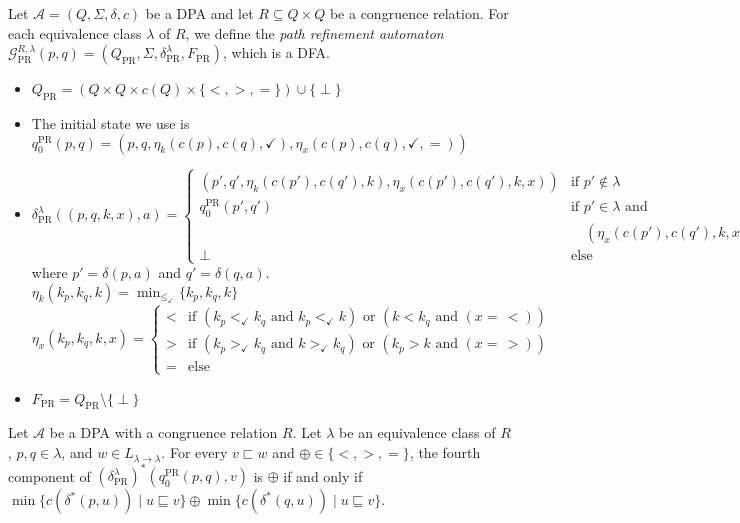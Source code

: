 \begin{defn}
	Let $\mathcal{A} = (Q, \Sigma, \delta, c)$ be a DPA and let $R \subseteq Q \times Q$ be a congruence relation. For each equivalence class $\lambda$ of $R$, we define the \emph{path refinement automaton} $\mathcal{G}_\text{PR}^{R,\lambda}(p, q) = (Q_\text{PR}, \Sigma, \delta^\lambda_\text{PR}, F_\text{PR})$, which is a DFA.
	
	\begin{itemize}
		\item $Q_\text{PR} = (Q \times Q \times c(Q) \times \{<, >, =\}) \cup \{ \perp \}$
		\item The initial state we use is $q_0^\text{PR}(p, q) = (p, q, \eta_k(c(p), c(q), \checkmark), \eta_x(c(p), c(q), \checkmark, =))$
		\item $\delta^\lambda_\text{PR}((p, q, k, x), a) = \begin{cases}
			(p', q', \eta_k(c(p'), c(q'), k), \eta_x(c(p'), c(q'), k, x)) & \text{if } p' \notin \lambda \\
			q_0^\text{PR}(p', q') & \text{if } p' \in \lambda \text{ and } \\ 
			& \quad (\eta_x(c(p'), c(q'), k, x) =\, =) \\
			\perp & \text{else}
		\end{cases}$ \\
			where $p' = \delta(p, a)$ and $q' = \delta(q, a)$. \\
			$\eta_k(k_p, k_q, k) = \min_{\leq_\checkmark} \{k_p, k_q, k\}$ \\
			$\eta_x(k_p, k_q, k, x) = \begin{cases}
				< & \text{if } (k_p <_\checkmark k_q \text{ and } k_p <_\checkmark k) \text{ or } (k < k_q \text{ and } (x =\, <)) \\
				> & \text{if } (k_p >_\checkmark k_q \text{ and } k >_\checkmark k_q) \text{ or } (k_p > k \text{ and } (x =\, >)) \\
				= & \text{else}
			\end{cases}$ 
		\item $F_\text{PR} = Q_\text{PR} \setminus \{\perp\}$
	\end{itemize}
\end{defn}

\begin{lem}
	Let $\mathcal{A}$ be a DPA with a congruence relation $R$. Let $\lambda$ be an equivalence class of $R$, $p, q \in \lambda$, and $w \in L_{\lambda \rightarrow \lambda}$. For every $v \sqsubset w$ and $\oplus \in \{<, >, =\}$, the fourth component of $(\delta_\text{PR}^\lambda)^*(q_0^\text{PR}(p, q), v)$ is $\oplus$ if and only if $\min \{ c(\delta^*(p, u)) \mid u \sqsubseteq v \} \oplus \min \{ c(\delta^*(q, u)) \mid u \sqsubseteq v \}$.
	\label{lem:pr:pr_game_nx}
\end{lem}

